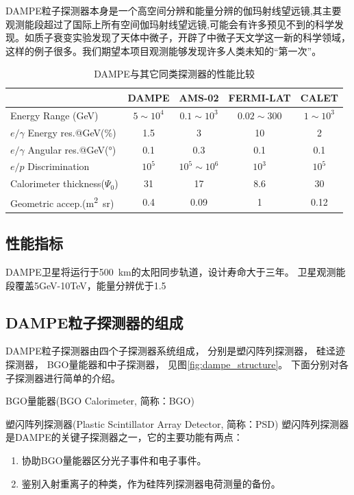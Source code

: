 DAMPE粒子探测器本身是一个高空间分辨和能量分辨的伽玛射线望远镜,其主要观测能段超过了国际上所有空间伽玛射线望远镜,可能会有许多预见不到的科学发现。如质子衰变实验发现了天体中微子，开辟了中微子天文学这一新的科学领域，这样的例子很多。我们期望本项目观测能够发现许多人类未知的“第一次”。

\begin{table}[htb]
	\centering
	\caption{DAMPE与其它同类探测器的性能比较}
	\label{tab:ch1:dampe_comparison}
	\begin{tabu} to \textwidth{lcccc}
		\toprule[1.5pt]
		  & DAMPE & AMS-02 & FERMI-LAT & CALET \\ 
		\midrule[1pt]
		Energy Range (\si{GeV}) & $5\sim10^4$ & $0.1\sim10^3$ & $0.02\sim300$ & $1\sim10^3$ \\ 
		$e/\gamma$ Energy res.@\si{GeV}(\si{\percent}) & 1.5 & 3 & 10 & 2 \\ 
		$e/\gamma$ Angular res.@\si{GeV}(\si{\degree}) & 0.1 & 0.3 & 0.1 & 0.1 \\ 
		$e/p$ Discrimination& $10^5$ & $10^5\sim10^6$ & $10^3$ & $10^5$ \\ 
		Calorimeter thickness($\Psi_0$) & 31 & 17 & 8.6 & 30 \\ 
		Geometric accep.(\si{\meter\squared\steradian}) & 0.4 & 0.09 & 1 & 0.12 \\ 
		\bottomrule[1.5pt] 
	\end{tabu} 
\end{table}

\subsection{性能指标}
DAMPE卫星将运行于\SI{500}{\kilo\meter}的太阳同步轨道，设计寿命大于三年。
卫星观测能段覆盖5GeV-10TeV，能量分辨优于1.5%
\subsection{DAMPE粒子探测器的组成}
DAMPE粒子探测器由四个子探测器系统组成， 分别是塑闪阵列探测器， 硅迳迹探测器， BGO量能器和中子探测器， 见图\ref{fig:dampe_structure}。
下面分别对各子探测器进行简单的介绍。

BGO量能器(BGO Calorimeter, 简称：BGO)

塑闪阵列探测器(Plastic Scintillator Array Detector, 简称：PSD)
塑闪阵列探测器是DAMPE的关键子探测器之一，它的主要功能有两点：
\begin{enumerate}
	\item 协助BGO量能器区分光子事件和电子事件。
	\item 鉴别入射重离子的种类，作为硅阵列探测器电荷测量的备份。
\end{enumerate}

